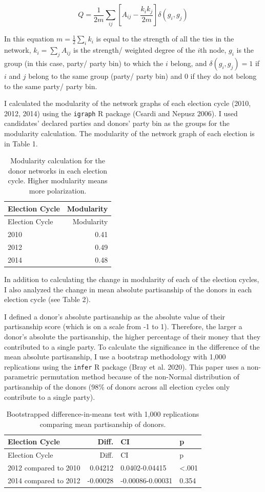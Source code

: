 \documentclass[12pt,]{article}
\begin{document}
\[Q = \frac{1}{2m} \sum_{ij}\left[A_{ij} - \frac{k_{i}k_{j}}{2m} \right]\delta(g_{i},g_{j})\]

In this equation \(m = \frac{1}{2}\sum_{i}k_{i}\) is equal to the
strength of all the ties in the network, \(k_{i}=\sum_{j}A_{ij}\) is the
strength/ weighted degree of the \(i\)th node, \(g_{i}\) is the group
(in this case, party/ party bin) to which the \(i\) belong, and
\(\delta(g_{i},g_{j}) = 1\) if \(i\) and \(j\) belong to the same group
(party/ party bin) and 0 if they do not belong to the same party/ party
bin.

I calculated the modularity of the network graphs of each election cycle
(2010, 2012, 2014) using the \texttt{igraph} R package (Csardi and
Nepusz 2006). I used candidates' declared parties and donors' party bin
as the groups for the modularity calculation. The modularity of the
network graph of each election is in Table 1.

\begin{longtable}[]{@{}lr@{}}
\caption{Modularity calculation for the donor networks in each election
cycle. Higher modularity means more polarization.}\tabularnewline
\toprule
Election Cycle & Modularity\tabularnewline
\midrule
\endfirsthead
\toprule
Election Cycle & Modularity\tabularnewline
\midrule
\endhead
2010 & 0.41\tabularnewline
2012 & 0.49\tabularnewline
2014 & 0.48\tabularnewline
\bottomrule
\end{longtable}

In addition to calculating the change in modularity of each of the
election cycles, I also analyzed the change in mean absolute
partisanship of the donors in each election cycle (see Table 2).

I defined a donor's absolute partisanship as the absolute value of their
partisanship score (which is on a scale from -1 to 1). Therefore, the
larger a donor's absolute the partisanship, the higher percentage of
their money that they contributed to a single party. To calculate the
significance in the difference of the mean absolute partisanship, I use
a bootstrap methodology with 1,000 replications using the \texttt{infer}
R package (Bray et al. 2020). This paper uses a non-parametric
permutation method because of the non-Normal distribution of
partisanship of the donors (98\% of donors across all election cycles
only contribute to a single party).

\begin{longtable}[]{@{}lrll@{}}
\caption{Bootstrapped difference-in-means test with 1,000 replications
comparing mean partisanship of donors.}\tabularnewline
\toprule
Election Cycle & Diff. & CI & p\tabularnewline
\midrule
\endfirsthead
\toprule
Election Cycle & Diff. & CI & p\tabularnewline
\midrule
\endhead
2012 compared to 2010 & 0.04212 & 0.0402-0.04415 &
\textless.001\tabularnewline
2014 compared to 2012 & -0.00028 & -0.00086-0.00031 &
0.354\tabularnewline
\bottomrule
\end{longtable}
\end{document}
